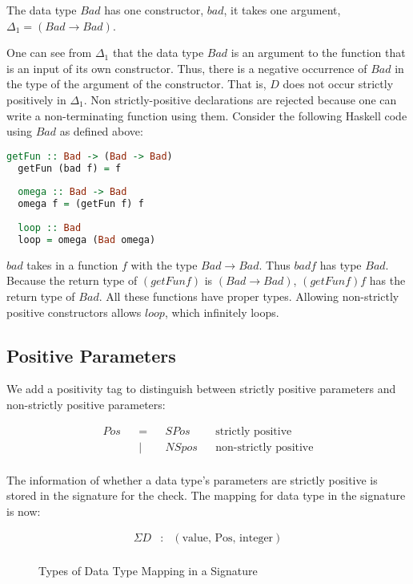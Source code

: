 \documentclass[acmsmall]{acmart}
\begin{document}
The data type $Bad$ has one constructor, $bad$, it takes one argument, $\Delta_1 = (Bad \to Bad)$. 

One can see from $\Delta_1$ that the data type $Bad$ is an argument to the function that is an input of its own constructor. Thus, there is a negative occurrence of $Bad$ in the type of the argument of the constructor. That is, $D$ does not occur strictly positively in $\Delta_1$. Non strictly-positive declarations are rejected because one can write a non-terminating function using them. Consider the following Haskell code using $Bad$ as defined above:

\begin{lstlisting}[language=haskell]
  getFun :: Bad -> (Bad -> Bad)
  getFun (bad f) = f
  
  omega :: Bad -> Bad
  omega f = (getFun f) f
  
  loop :: Bad
  loop = omega (Bad omega)
\end{lstlisting}

$bad$ takes in a function $f$ with the type $Bad \to Bad$. Thus $bad f$ has type $Bad$. Because the return type of $(getFun f)$ is $(Bad \to Bad)$, $(getFun f) f$ has the return type of $Bad$. All these functions have proper types. Allowing non-strictly positive constructors allows $loop$, which infinitely loops.

\subsection{Positive Parameters}

We add a positivity tag to distinguish between strictly positive parameters and non-strictly positive parameters:

\begin{figure}[H]
  \begin{equation*}
    \begin{aligned}
      Pos &  & = &  & SPos  &  & \textrm{strictly positive}     \\
          &  & | &  & NSpos &  & \textrm{non-strictly positive} \\
    \end{aligned}
  \end{equation*}
\end{figure}

The information of whether a data type's parameters are strictly positive is stored in the signature for the check. The mapping for data type in the signature is now:

\begin{figure}[H]
  \begin{equation*}
    \begin{aligned}
      \Sigma D & : & (\textrm{value, Pos, integer}) \\
    \end{aligned}
  \end{equation*}
  \caption{Types of Data Type Mapping in a Signature}
\end{figure}
\end{document}
